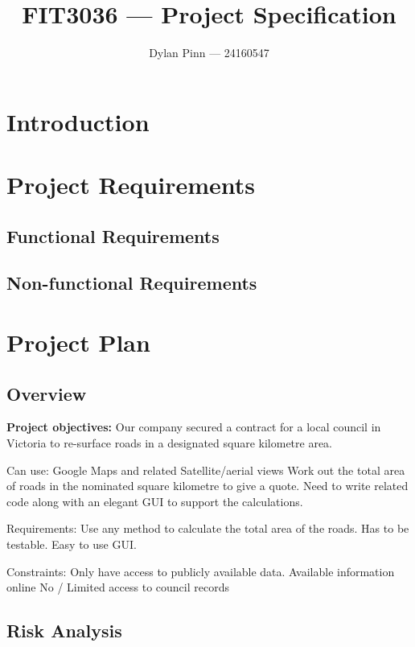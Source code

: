 \documentclass[a4paper,11pt]{article}
\begin{document}
\title{FIT3036 --- Project Specification}
\author{Dylan Pinn --- 24160547}
\maketitle
\pagebreak

\tableofcontents
\pagebreak

\section{Introduction}

\section{Project Requirements}

\subsection{Functional Requirements}

\subsection{Non-functional Requirements}

\section{Project Plan}

\subsection{Overview}

\textbf{Project objectives:} Our company secured a contract for a local council in Victoria to re-surface roads in a designated square kilometre area.

Can use:
Google Maps and related
Satellite/aerial views
Work out the total area of roads in the nominated square kilometre to give a quote.
Need to write related code along with an elegant GUI to support the calculations.

Requirements:
Use any method to calculate the total area of the roads.
Has to be testable.
Easy to use GUI.

Constraints:
Only have access to publicly available data.
Available information online
No / Limited access to council records

\subsection{Risk Analysis}
\end{document}
